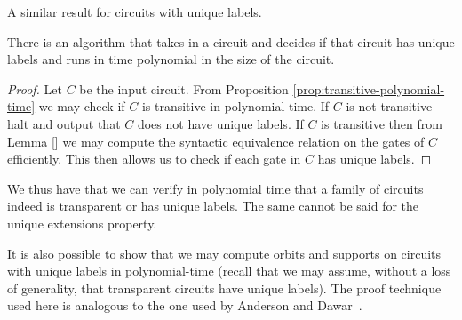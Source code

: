 \documentclass[../paper.tex]{subfiles}
\begin{document}
A similar result for circuits with unique labels.

\begin{cor}
  There is an algorithm that takes in a circuit and decides if that circuit has
  unique labels and runs in time polynomial in the size of the circuit.
\end{cor}
\begin{proof}
  Let $C$ be the input circuit. From Proposition
  \ref{prop:transitive-polynomial-time} we may check if $C$ is transitive in
  polynomial time. If $C$ is not transitive halt and output that $C$ does not
  have unique labels. If $C$ is transitive then from Lemma \ref{} we may compute
  the syntactic equivalence relation on the gates of $C$ efficiently. This then
  allows us to check if each gate in $C$ has unique labels.
\end{proof}

We thus have that we can verify in polynomial time that a family of circuits
indeed is transparent or has unique labels. The same cannot be said for the
unique extensions property.

It is also possible to show that we may compute orbits and supports on circuits
with unique labels in polynomial-time (recall that we may assume, without a loss
of generality, that transparent circuits have unique labels). The proof
technique used here is analogous to the one used by Anderson and
Dawar~\cite{AndersonD17}.
\end{document}
